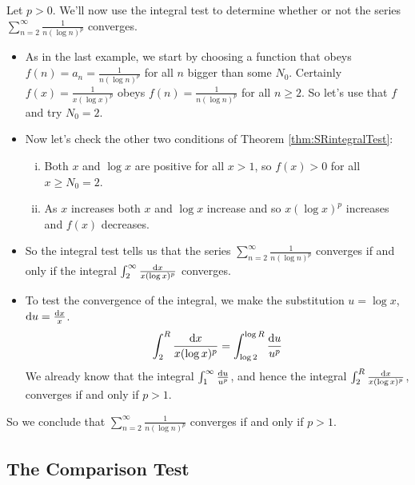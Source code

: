 \begin{eg}[$\sum\limits_{n=2}^\infty\frac{1}{n(\log n)^p}$]\label{eg:SRlnpTest}
Let $p>0$. We'll now use the integral test to determine whether or not the
series $\sum\limits_{n=2}^\infty\frac{1}{n(\log n)^p}$ converges.
\begin{itemize}
\item
As in the last example, we start by choosing a function that obeys
$f(n)=a_n=\frac{1}{n(\log n)^p}$ for all $n$
bigger than some $N_0$. Certainly $f(x)=\frac{1}{x(\log x)^p}$ obeys
$f(n)=\frac{1}{n(\log n)^p}$ for all $n\ge 2$. So let's use that $f$ and
try $N_0=2$.
\item
Now let's check the other two conditions of
Theorem \ref{thm:SRintegralTest}:
\begin{enumerate}[(i)]
\item Both $x$ and $\log x$ are positive for all $x>1$, so $f(x)>0$ for all $x\ge N_0=2$.
\item  As $x$ increases both $x$ and $\log x$ increase and so $x(\log x)^p$
increases and $f(x)$ decreases.
\end{enumerate}
\item
So the integral test tells us that the series
$\sum\limits_{n=2}^\infty\frac{1}{n(\log n)^p}$ converges if and only if
the integral $\int_2^\infty\frac{\mathrm{d}x}{x (\log x)^p}$ converges.
\item
To test
the convergence of the integral, we make the substitution $u=\log x$,
$\mathrm{d}u=\frac{\mathrm{d}x}{x}$.
\begin{align*}
\int_2^R \frac{\mathrm{d}x}{x (\log x)^p}
=\int_{\log 2}^{\log R}\frac{\mathrm{d}u}{u^p}
\end{align*}
 We already know that the integral $\int_1^\infty\frac{\mathrm{d}u}{u^p}$,
and hence the integral $\int_2^R \frac{\mathrm{d}x}{x (\log x)^p}$, converges if and
only if $p>1$.
\end{itemize}
So we conclude that
$\sum\limits_{n=2}^\infty\frac{1}{n(\log n)^p}$
converges if and only if $p>1$.
\end{eg}

\subsection{The Comparison Test}

